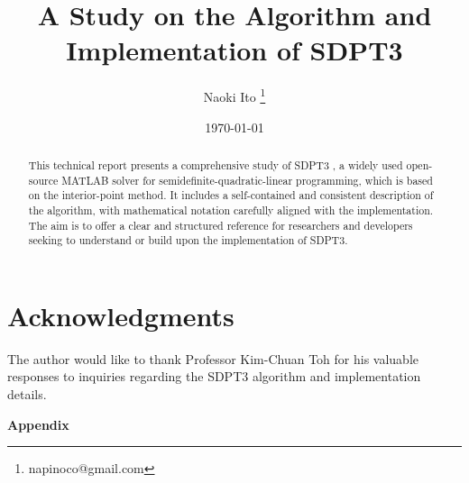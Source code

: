\documentclass{scrartcl}
\title{A Study on the Algorithm and Implementation of SDPT3}
\author{
    Naoki Ito
    \thanks{napinoco@gmail.com}
}
\date{\today}
\begin{document}
\maketitle
\begin{abstract}
This technical report presents a comprehensive study of SDPT3 \cite{toh1999,tutuncu2003,Toh2012}, a widely used open-source MATLAB solver for semidefinite-quadratic-linear programming, which is based on the interior-point method.
It includes a self-contained and consistent description of the algorithm, with mathematical notation carefully aligned with the implementation.
The aim is to offer a clear and structured reference for researchers and developers seeking to understand or build upon the implementation of SDPT3.
\end{abstract}

\tableofcontents









\section*{Acknowledgments}
The author would like to thank Professor Kim-Chuan Toh for his valuable responses to inquiries
regarding the SDPT3 algorithm and implementation details.

\clearpage
{}
{}
\begin{center}
{\Large\bfseries\textsf{Appendix}}
\end{center}
\vspace{2em}

\appendix





\end{document}
